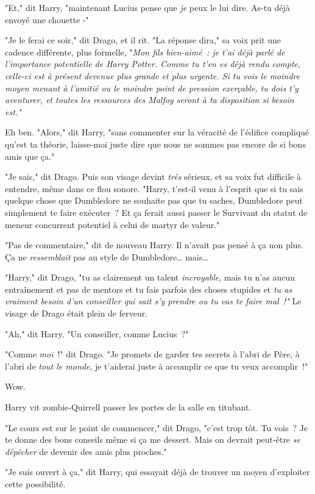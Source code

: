 "Et," dit Harry, "maintenant Lucius pense que \emph{je} peux le lui dire. As-tu déjà envoyé une chouette -"

"Je le ferai ce soir," dit Drago, et il rit. "La réponse dira," sa voix prit une cadence différente, plus formelle, "\emph{Mon fils bien-aimé~: je t'ai déjà parlé de l'importance potentielle de Harry Potter. Comme tu t'en es déjà rendu compte, celle-ci est à présent devenue plus grande et plus urgente. Si tu vois le moindre moyen menant à l'amitié ou le moindre point de pression exerçable, tu dois t'y aventurer, et toutes les ressources des Malfoy seront à ta disposition si besoin est."}

Eh ben. "Alors," dit Harry, "sans commenter sur la véracité de l'édifice compliqué qu'est ta théorie, laisse-moi juste dire que nous ne sommes pas encore de si bons amis que ça."

"Je sais," dit Drago. Puis son visage devint \emph{très} sérieux, et sa voix fut difficile à entendre, même dans ce flou sonore. "Harry, t'est-il venu à l'esprit que si tu sais quelque chose que Dumbledore ne souhaite pas que tu saches, Dumbledore peut simplement te faire exécuter~? Et ça ferait aussi passer le Survivant du statut de meneur concurrent potentiel à celui de martyr de valeur."

"Pas de commentaire," dit de nouveau Harry. Il n'avait pas pensé à ça non plus. Ça ne \emph{ressemblait} pas au style de Dumbledore… mais…

"Harry," dit Drago, "tu as clairement un talent \emph{incroyable}, mais tu n'as aucun entraînement et pas de mentors et tu fais parfois des choses stupides et \emph{tu as vraiment besoin d'un conseiller qui sait s'y prendre ou tu vas te faire mal~!"} Le visage de Drago était plein de ferveur.

"Ah," dit Harry. "Un conseiller, comme Lucius~?"

"Comme \emph{moi}~!" dit Drago. "Je promets de garder tes secrets à l'abri de Père, à l'abri de \emph{tout le monde}, je t'aiderai juste à accomplir ce que tu veux accomplir~!"

Wow.

Harry vit zombie-Quirrell passer les portes de la salle en titubant.

"Le cours est sur le point de commencer," dit Drago, "c'est trop tôt. Tu vois~? Je te donne des bons conseils même si ça me dessert. Mais on devrait peut-être \emph{se dépêcher} de devenir des amis plus proches."

"Je suis ouvert à ça," dit Harry, qui essayait déjà de trouver un moyen d'exploiter cette possibilité.

